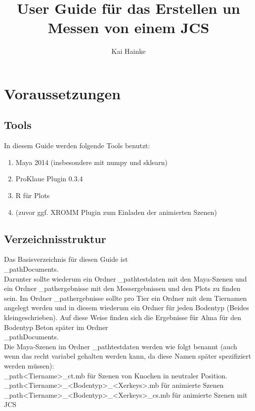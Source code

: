 \documentclass[a4paper, openany, oneside]{memoir}
\title{User Guide für das Erstellen un Messen von einem JCS}
\author{Kai Hainke}
\begin{document}
\maketitle




\chapter{Voraussetzungen}
\section{Tools}
In diesem Guide werden folgende Tools benutzt:
\begin{enumerate}
\item Maya 2014 (insbesondere mit numpy und sklearn)
\item ProKlaue Plugin 0.3.4 
\item R für Plots
\item (zuvor ggf. XROMM Plugin zum Einladen der animierten Szenen)
\end{enumerate}

\section{Verzeichnisstruktur}
Das Basisverzeichnis für diesen Guide ist \\
\dir_path{Documents\ProKlaue\testdaten\achsen}.\\
Darunter sollte wiederum ein Ordner \dir_path{testdaten} mit den Maya-Szenen und ein Ordner \dir_path{ergebnisse} mit den Messergebnissen und den Plots zu finden sein. Im Ordner \dir_path{ergebnisse} sollte pro Tier ein Ordner mit dem Tiernamen angelegt werden und in diesem wiederum ein Ordner für jeden Bodentyp (Beides kleingeschrieben). Auf diese Weise finden sich die Ergebnisse für Alma für den Bodentyp Beton später im Ordner 
\\\dir_path{Documents\ProKlaue\testdaten\achsen\ergebnisse\alma\beton}.\\ 
Die Maya-Szenen im Ordner \dir_path{testdaten} werden wie folgt benannt (auch wenn das recht variabel gehalten werden kann, da diese Namen später spezifiziert werden müssen):\\
\File_path{<Tiername>_ct.mb} für Szenen von Knochen in neutraler Position. \\
\File_path{<Tiername>_<Bodentyp>_<Xerkeys>.mb} für animierte Szenen \\
\File_path{<Tiername>_<Bodentyp>_<Xerkeys>_cs.mb} für animierte Szenen mit JCS \\
\end{document}

